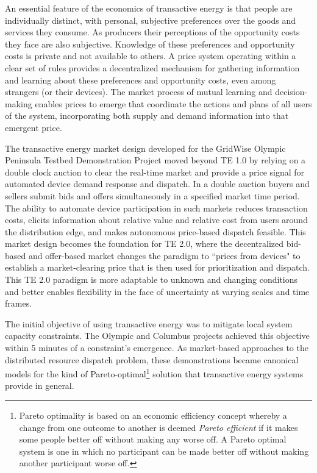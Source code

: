 \documentclass[10pt,twocolumn]{article}
\begin{document}
An essential feature of the economics of transactive energy is that people are individually distinct, with personal, subjective preferences over the goods and services they consume. As producers their perceptions of the opportunity costs they face are also subjective. Knowledge of these preferences and opportunity costs is private and not available to others. A price system operating within a clear set of rules provides a decentralized mechanism for gathering information and learning about these preferences and opportunity costs, even among strangers (or their devices). The market process of mutual learning and decision-making enables prices to emerge that coordinate the actions and plans of all users of the system, incorporating both supply and demand information into that emergent price.

The transactive energy market design developed for the GridWise Olympic Peninsula Testbed Demonstration Project \cite{hammerstrom2007} moved beyond TE 1.0 by relying on a double clock auction to clear the real-time market and provide a price signal for automated device demand response and dispatch. In a double auction buyers and sellers submit bids and offers simultaneously in a specified market time period. The ability to automate device participation in such markets reduces transaction costs, elicits information about relative value and relative cost from users around the distribution edge, and makes autonomous price-based dispatch feasible. This market design becomes the foundation for TE 2.0, where the decentralized bid-based and offer-based market changes the paradigm to ``prices from devices" to establish a market-clearing price that is then used for prioritization and dispatch. This TE 2.0 paradigm is more adaptable to unknown and changing conditions and better enables flexibility in the face of uncertainty at varying scales and time frames.

The initial objective of using transactive energy was to mitigate local system capacity constraints. The Olympic \cite{hammerstrom2007} and Columbus \cite{widergren2014} projects achieved this objective within 5 minutes of a constraint's emergence. As market-based approaches to the distributed resource dispatch problem, these demonstrations became canonical models for the kind of Pareto-optimal\footnote{Pareto optimality is based on an economic efficiency concept whereby a change from one outcome to another is deemed \textit{Pareto efficient} if it makes some people better off without making any worse off. A Pareto optimal system is one in which no participant can be made better off without making another participant worse off.} solution that transactive energy systems provide in general.
\end{document}
